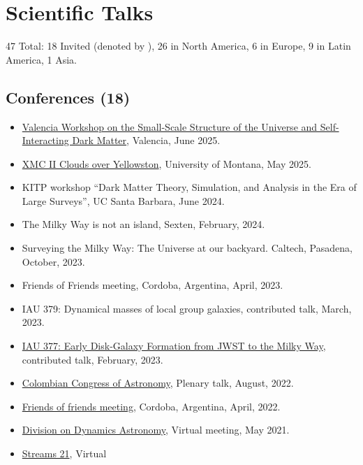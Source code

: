 \documentclass[14pt]{article}
\begin{document}
\section*{Scientific Talks}

47 Total: 18 Invited (denoted by \dag), 26 in North America, 6 in Europe, 9 in Latin America, 1 Asia.\\


\subsection*{Conferences (18)}

\begin{itemize}
  \setlength\itemsep{0.0em}
  \renewcommand\labelitemi{$\cdot$}
\item \href{https://indico.ific.uv.es/event/7815/}{Valencia Workshop on the Small-Scale Structure of the Universe
    and Self-Interacting Dark Matter}, Valencia, June 2025.
\item \href{https://sites.google.com/view/xmciiworkshop/home}{XMC II Clouds over Yellowston}, University of Montana, May 2025.
\item KITP workshop ``Dark Matter Theory, Simulation, and Analysis in the Era of Large Surveys'', UC Santa Barbara, June 2024. \dag
\item The Milky Way is not an island, Sexten, February, 2024. 
\item Surveying the Milky Way: The Universe at our backyard. Caltech,
  Pasadena, October, 2023.
\item Friends of Friends meeting, Cordoba, Argentina, April, 2023. \dag
\item IAU 379: Dynamical masses of local group galaxies, contributed talk, March, 2023.
\item \href{https://www.mso.anu.edu.au/~yting/Malaysia_IAU/}{IAU 377: Early Disk-Galaxy Formation
from JWST to the Milky Way}, contributed talk, February, 2023.
\item \href{https://accefyn.com/microsites/nodos/astroco/congreso-colombiano-de-astronomia-cocoa-2022%E2%80%8B/}{Colombian Congress of Astronomy}, Plenary talk, August, 2022. \dag
\item \href{http://fof.oac.uncor.edu/2022/}{Friends of friends meeting}, Cordoba, Argentina, April, 2022.
\item \href{https://aas.org/meetings/dda52}{Division on Dynamics Astronomy}, Virtual meeting, May 2021.
\item \href{https://stellarstreams.org/streams21/}{Streams 21}, Virtual

\end{itemize}
\end{document}
